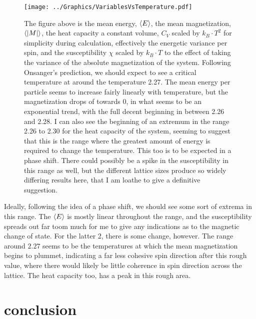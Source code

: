 \documentclass[10pt, twocolumn]{revtex4-1}
\begin{document}
\begin{figure}[hbtp]
    \texttt{[image: ../Graphics/VariablesVsTemperature.pdf]}
    \caption{The figure above is the mean energy, $\ev{E}$, the mean magnetization, $\ev{|M|}$, the heat capacity a constant volume,
    $C_V$ scaled by $k_B\cdot T^2$ for simplicity during calculation, effectively the energetic variance per spin, and the susceptibility
    $\chi$ scaled by $k_B\cdot T$ to the effect of taking the variance of the absolute magnetization of the system. Following Onsanger's
    prediction, we should expect to see a critical temperature at around the temperature 2.27. The mean energy per particle seems to increase
    fairly linearly with temperature, but the magnetization drops of towards 0, in what seems to be an exponential trend, with the full decent
    beginning in between 2.26 and 2.28. I can also see the beginning of an extremum in the range 2.26 to 2.30 for the heat capacity of the system,
    seeming to suggest that this is the range where the greatest amount of energy is required to change the temperature. This too is to be expected
    in a phase shift. There could possibly be a spike in the susceptibility in this range as well, but the different lattice sizes produce so widely
    differing results here, that I am loathe to give a definitive suggestion.}
\label{fig:VarVsTime}
\end{figure}

Ideally, following the idea of a phase shift, we should see some sort of extrema in this range. The $\ev{E}$ is mostly linear throughout the range,
and the susceptibility spreads out far toom much for me to give any indications as to the magnetic change of state. For the latter 2, there is some change,
however. The range around $2.27$ seems to be the temperatures at which the mean magnetization begins to plummet, indicating a far less cohesive spin direction
after this rough value, where there would likely be little coherence in spin direction across the lattice. The heat capacity too, has a peak in this rough
area.



\section{conclusion}
\end{document}
